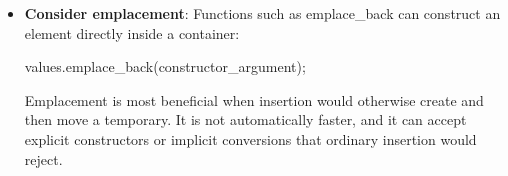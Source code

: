 \documentclass{report}
\begin{document}
\begin{itemize}
        \item \textbf{Consider emplacement}: Functions such as emplace\_back can construct an element directly inside a container:
            \bigbreak \noindent 
            \begin{cppcode}
            values.emplace_back(constructor_argument);
            \end{cppcode}
            \bigbreak \noindent 
            Emplacement is most beneficial when insertion would otherwise create and then move a temporary. It is not automatically faster, and it can accept explicit constructors or implicit conversions that ordinary insertion would reject.







    \end{itemize}
\end{document}
